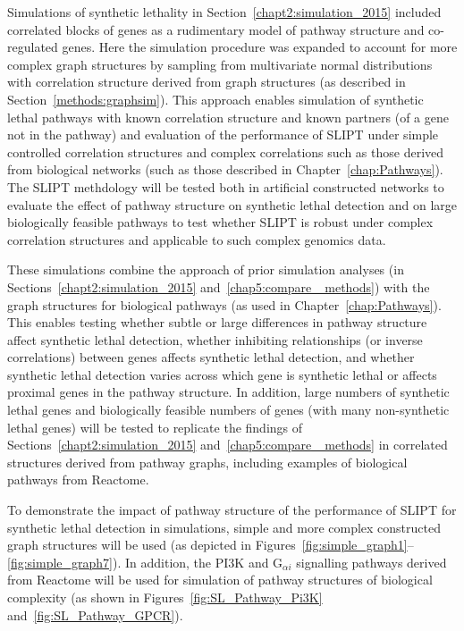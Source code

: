 Simulations of synthetic lethality in Section~\ref{chapt2:simulation_2015} included correlated blocks of genes as a rudimentary model of pathway structure and co-regulated genes. Here the simulation procedure was expanded to account for more complex graph structures by sampling from multivariate normal distributions with correlation structure derived from graph structures (as described in Section~\ref{methods:graphsim}). This approach enables simulation of synthetic lethal pathways with known correlation structure and known partners (of a gene not in the pathway) and evaluation of the performance of \gls{SLIPT} under simple controlled correlation structures and complex correlations such as those derived from biological networks (such as those described in Chapter~\ref{chap:Pathways}). The \gls{SLIPT} methdology will be tested both in artificial constructed networks to evaluate the effect of pathway structure on synthetic lethal detection and on large biologically feasible pathways to test whether \gls{SLIPT} is robust under complex correlation structures and applicable to such complex genomics data.

These simulations combine the approach of prior simulation analyses (in Sections~\ref{chapt2:simulation_2015} and~\ref{chap5:compare_ methods}) with the graph structures for biological pathways (as used in Chapter~\ref{chap:Pathways}). This enables testing whether subtle or large differences in pathway structure affect synthetic lethal detection, whether inhibiting relationships (or inverse correlations) between genes affects synthetic lethal detection, and whether synthetic lethal detection varies across which gene is synthetic lethal or affects proximal genes in the pathway structure. In addition, large numbers of synthetic lethal genes and biologically feasible numbers of genes (with many non-synthetic lethal genes) will be tested to replicate the findings of Sections~\ref{chapt2:simulation_2015} and~\ref{chap5:compare_ methods} in correlated structures derived from pathway graphs, including examples of biological pathways from Reactome.

To demonstrate the impact of pathway structure of the performance of \gls{SLIPT} for synthetic lethal detection in simulations, simple and more complex constructed graph structures will be used (as depicted in Figures~\ref{fig:simple_graph1}\nobreakdash--\ref{fig:simple_graph7}). In addition, the \gls{PI3K} and G$_{\alpha i}$ signalling pathways derived from Reactome will be used for simulation of pathway structures of biological complexity (as shown in Figures~\ref{fig:SL_Pathway_Pi3K} and~\ref{fig:SL_Pathway_GPCR}).


